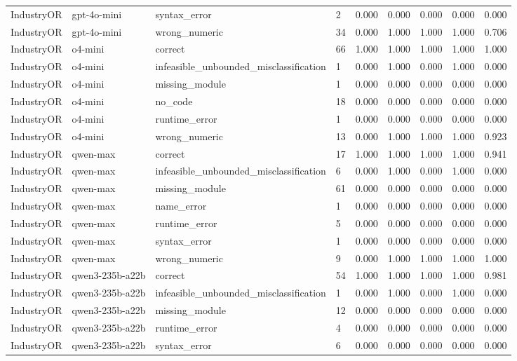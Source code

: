 \begin{table}[t]
\begin{tabular}{lllllllll}
IndustryOR & gpt-4o-mini & syntax\_error & 2 & 0.000 & 0.000 & 0.000 & 0.000 & 0.000 \\
IndustryOR & gpt-4o-mini & wrong\_numeric & 34 & 0.000 & 1.000 & 1.000 & 1.000 & 0.706 \\
IndustryOR & o4-mini & correct & 66 & 1.000 & 1.000 & 1.000 & 1.000 & 1.000 \\
IndustryOR & o4-mini & infeasible\_unbounded\_misclassification & 1 & 0.000 & 1.000 & 0.000 & 1.000 & 0.000 \\
IndustryOR & o4-mini & missing\_module & 1 & 0.000 & 0.000 & 0.000 & 0.000 & 0.000 \\
IndustryOR & o4-mini & no\_code & 18 & 0.000 & 0.000 & 0.000 & 0.000 & 0.000 \\
IndustryOR & o4-mini & runtime\_error & 1 & 0.000 & 0.000 & 0.000 & 0.000 & 0.000 \\
IndustryOR & o4-mini & wrong\_numeric & 13 & 0.000 & 1.000 & 1.000 & 1.000 & 0.923 \\
IndustryOR & qwen-max & correct & 17 & 1.000 & 1.000 & 1.000 & 1.000 & 0.941 \\
IndustryOR & qwen-max & infeasible\_unbounded\_misclassification & 6 & 0.000 & 1.000 & 0.000 & 1.000 & 0.000 \\
IndustryOR & qwen-max & missing\_module & 61 & 0.000 & 0.000 & 0.000 & 0.000 & 0.000 \\
IndustryOR & qwen-max & name\_error & 1 & 0.000 & 0.000 & 0.000 & 0.000 & 0.000 \\
IndustryOR & qwen-max & runtime\_error & 5 & 0.000 & 0.000 & 0.000 & 0.000 & 0.000 \\
IndustryOR & qwen-max & syntax\_error & 1 & 0.000 & 0.000 & 0.000 & 0.000 & 0.000 \\
IndustryOR & qwen-max & wrong\_numeric & 9 & 0.000 & 1.000 & 1.000 & 1.000 & 1.000 \\
IndustryOR & qwen3-235b-a22b & correct & 54 & 1.000 & 1.000 & 1.000 & 1.000 & 0.981 \\
IndustryOR & qwen3-235b-a22b & infeasible\_unbounded\_misclassification & 1 & 0.000 & 1.000 & 0.000 & 1.000 & 0.000 \\
IndustryOR & qwen3-235b-a22b & missing\_module & 12 & 0.000 & 0.000 & 0.000 & 0.000 & 0.000 \\
IndustryOR & qwen3-235b-a22b & runtime\_error & 4 & 0.000 & 0.000 & 0.000 & 0.000 & 0.000 \\
IndustryOR & qwen3-235b-a22b & syntax\_error & 6 & 0.000 & 0.000 & 0.000 & 0.000 & 0.000 \\

\end{tabular}
\end{table}

